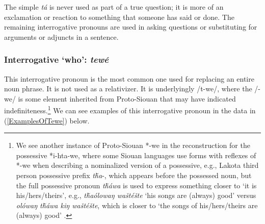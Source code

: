 The simple \textit{tá} is never used as part of a true question; it is more of an exclamation or reaction to something that someone has said or done. The remaining interrogative pronouns are used in asking questions or substituting for arguments or adjuncts in a sentence.

\subsubsection{Interrogative `who': \textit{tewé}}\label{SubSubSecTewe}

This interrogative pronoun is the most common one used for replacing an entire noun phrase. It is not used as a relativizer. It is underlyingly /t-we/, where the /-we/ is some element inherited from Proto-Siouan that may have indicated indefiniteness.\footnote{We see another instance of Proto-Siouan *-we in the reconstruction for the possessive *i-hta-we, where some Siouan languages use forms with reflexes of *-we when describing a nominalized version of a possessive, e.g., Lakota third person possessive prefix \textit{tȟa}-, which appears before the possessed noun, but the full possessive pronoun \textit{tȟáwa} is used to express something closer to `it is his/hers/theirs', e.g., \textit{tȟaólowaŋ waštéšte} `his songs are (always) good' versus \textit{olówaŋ tȟáwa kiŋ waštéšte}, which is closer to `the songs of his/hers/theirs are (always) good' \citep[188ff]{ullrichblackbear2016}.} We can see examples of this interrogative pronoun in the data in (\ref{ExamplesOfTewe}) below.


